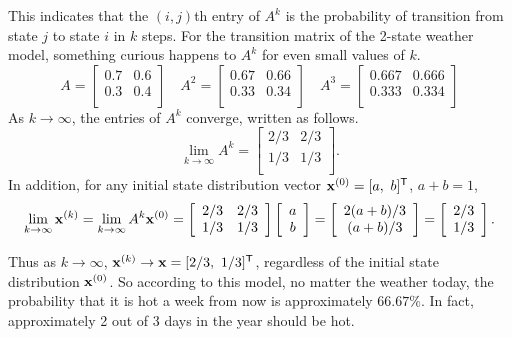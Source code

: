 This indicates that the $(i,j)$th entry of $A^k$ is the probability of transition from state $j$ to state $i$ in $k$ steps.
For the transition matrix of the 2-state weather model, something curious happens to $A^k$ for even small values of $k$.
\[
A = \left[\begin{array}{cc}
0.7 & 0.6 \\
0.3 & 0.4 \\
\end{array}\right]
\quad
A^2 = \left[\begin{array}{cc}
0.67 & 0.66 \\
0.33 & 0.34 \\
\end{array}\right]
\quad
A^3 = \left[\begin{array}{cc}
0.667 & 0.666 \\
0.333 & 0.334 \\
\end{array}\right]
\]
As $k\rightarrow\infty$, the entries of $A^k$ converge, written as follows.
\begin{equation}
\lim_{k \rightarrow \infty} A^k = \left[\begin{array}{ccc}
2/3 & 2/3 \\
1/3 & 1/3 \\
\end{array}\right].
\label{eq:markov-steady-transition}
\end{equation}
In addition, for any initial state distribution vector $\mathbf{x}^{(0)} = [a,\ b]^{\mathsf T}$, $a + b = 1$,
\[
\lim_{k \rightarrow \infty} \mathbf{x}^{(k)} = \lim_{k \rightarrow \infty}A^k\mathbf{x}^{(0)}
=
\left[\begin{array}{ccc}
2/3 & 2/3 \\
1/3 & 1/3 \\
\end{array}\right]
\left[\begin{array}{c}a\\b\end{array}\right]
=
\left[\begin{array}{c}2(a+b)/3\\(a+b)/3\end{array}\right]
=
\left[\begin{array}{c}2/3\\1/3\end{array}\right].
\]

Thus as $k\rightarrow\infty$, $\x^{(k)} \rightarrow \x = [2/3,\ 1/3]\trp$, regardless of the initial state distribution $\mathbf{x}^{(0)}$.
So according to this model, no matter the weather today, the probability that it is hot a week from now is approximately $66.67\%$.
In fact, approximately 2 out of 3 days in the year should be hot.

